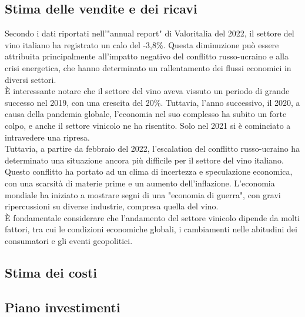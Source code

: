 \documentclass[12pt, a4paper]{article}
\newcommand{\meskip}{\medskip \\}
\begin{document}
\subsection{Stima delle vendite e dei ricavi}
Secondo i dati riportati nell'"annual report" di Valoritalia del 2022, il settore del vino italiano ha registrato un calo del -3,8\%. Questa diminuzione può essere attribuita principalmente all'impatto negativo del conflitto russo-ucraino e alla crisi energetica, che hanno determinato un rallentamento dei flussi economici in diversi settori.\meskip
È interessante notare che il settore del vino aveva vissuto un periodo di grande successo nel 2019, con una crescita del 20\%. Tuttavia, l'anno successivo, il 2020, a causa della pandemia globale, l'economia nel suo complesso ha subito un forte colpo, e anche il settore vinicolo ne ha risentito. Solo nel 2021 si è cominciato a intravedere una ripresa.\meskip
Tuttavia, a partire da febbraio del 2022, l'escalation del conflitto russo-ucraino ha determinato una situazione ancora più difficile per il settore del vino italiano. Questo conflitto ha portato ad un clima di incertezza e speculazione economica, con una scarsità di materie prime e un aumento dell'inflazione. L'economia mondiale ha iniziato a mostrare segni di una "economia di guerra", con gravi ripercussioni su diverse industrie, compresa quella del vino.\meskip
È fondamentale considerare che l'andamento del settore vinicolo dipende da molti fattori, tra cui le condizioni economiche globali, i cambiamenti nelle abitudini dei consumatori e gli eventi geopolitici. 

\subsection{Stima dei costi}

\subsection{Piano investimenti}
\end{document}

